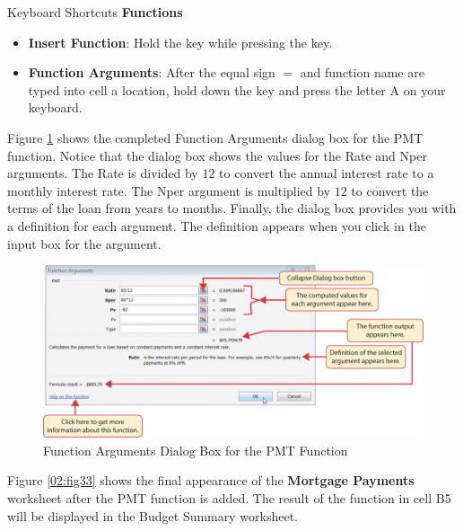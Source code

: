 \begin{center}
	\begin{shtcutbox}{Keyboard Shortcuts}
		\textbf{Functions}
		\\
		\begin{itemize}
			\setlength{\itemsep}{0pt}
			\setlength{\parskip}{0pt}
			\setlength{\parsep}{0pt}
			
			\item \textbf{Insert Function}: Hold the  key while pressing the  key.
			\item \textbf{Function Arguments}: After the equal sign $ = $ and function name are typed into cell a location, hold down the  key and press the letter A on your keyboard.		
		\end{itemize}
	
	\end{shtcutbox}
\end{center}

Figure \ref{02:fig32} shows the completed Function Arguments dialog box for the PMT function. Notice that the dialog box shows the values for the Rate and Nper arguments. The Rate is divided by $ 12 $ to convert the annual interest rate to a monthly interest rate. The Nper argument is multiplied by $ 12 $ to convert the terms of the loan from years to months. Finally, the dialog box provides you with a definition for each argument. The definition appears when you click in the input box for the argument.

\begin{figure}[H]
	\centering
	\includegraphics[width=\maxwidth{.95\linewidth}]{gfx/ch02_fig32}
	\caption{Function Arguments Dialog Box for the PMT Function}
	\label{02:fig32}
\end{figure}

Figure \ref{02:fig33} shows the final appearance of the \textbf{Mortgage Payments} worksheet after the PMT function is added. The result of the function in cell \textsf{B5} will be displayed in the Budget Summary worksheet.

